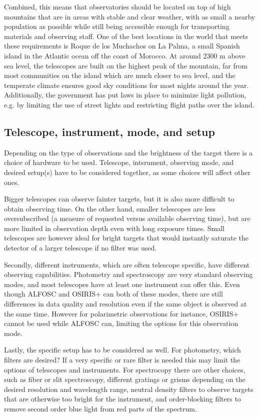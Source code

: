 \documentclass[a4paper,oneside,12pt, class=Latex/Classes/PhDthesisPSnPDF, crop=false]{standalone}
\begin{document}
Combined, this means that observatories should be located on top of high mountains that are in areas with stable and clear weather, with as small a nearby population as possible while still being accessible enough for transporting materials and observing staff. One of the best locations in the world that meets these requirements is Roque de los Muchachos on La Palma, a small Spanish island in the Atlantic ocean off the coast of Morocco. At around 2300 m above sea level, the telescopes are built on the highest peak of the mountain, far from most communities on the island which are much closer to sea level, and the temperate climate ensures good sky conditions for most nights around the year. Additionally, the government has put laws in place to minimize light pollution, e.g. by limiting the use of street lights and restricting flight paths over the island.


\subsection{Telescope, instrument, mode, and setup}
Depending on the type of observations and the brightness of the target there is a choice of hardware to be used. Telescope, intsrument, observing mode, and desired setup(s) have to be considered together, as some choices will affect other ones.

Bigger telescopes can observe fainter targets, but it is also more difficult to obtain observing time. On the other hand, smaller telescopes are less oversubscribed (a measure of requested versus available observing time), but are more limited in observation depth even with long exposure times. Small telescopes are however ideal for bright targets that would instantly saturate the detector of a larger telescope if no filter was used.

Secondly, different instruments, which are often telescope specific, have different observing capabilities. Photometry and spectroscopy are very standard observing modes, and most telescopes have at least one instrument can offer this. Even though ALFOSC and OSIRIS+ can both of these modes, there are still differences in data quality and resolution even if the same object is observed at the same time. However for polarimetric observations for instance, OSIRIS+ cannot be used while ALFOSC can, limiting the options for this observation mode.

Lastly, the specific setup has to be considered as well. For photometry, which filters are desired? If a very specific or rare filter is needed this may limit the options of telescopes and instruments. For spectrocopy there are other choices, such as fiber or slit spectroscopy, different gratings or grisms depending on the desired resolution and wavelength range, neutral density filters to observe targets that are otherwise too bright for the instrument, and order-blocking filters to remove second order blue light from red parts of the spectrum.
\end{document}

